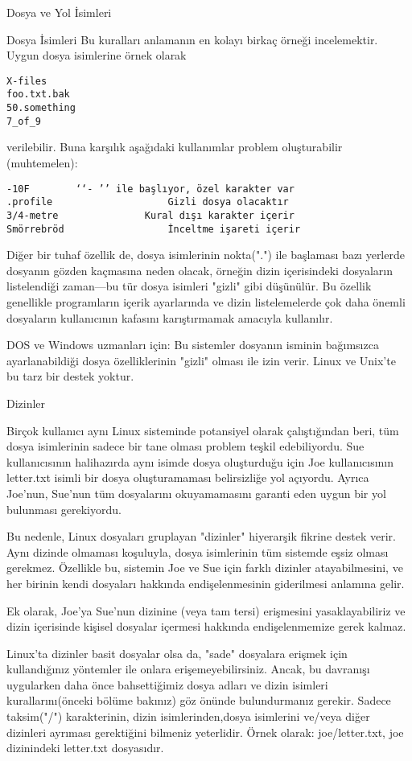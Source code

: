 \begin{section}{Dosya ve Yol İsimleri}
\begin{subsection}{Dosya İsimleri}
Bu kuralları anlamanın en kolayı birkaç örneği incelemektir. Uygun dosya isimlerine örnek olarak
\begin{verbatim}
X-files
foo.txt.bak
50.something
7_of_9
\end{verbatim}
verilebilir. Buna karşılık aşağıdaki kullanımlar problem oluşturabilir (muhtemelen):
\begin{verbatim}
-10F 		‘‘- ’’ ile başlıyor, özel karakter var
.profile 					Gizli dosya olacaktır
3/4-metre 				Kural dışı karakter içerir
Smörrebröd 					İnceltme işareti içerir
\end{verbatim}

Diğer bir tuhaf özellik de, dosya isimlerinin nokta(".") ile başlaması bazı yerlerde dosyanın gözden kaçmasına neden olacak, örneğin dizin içerisindeki dosyaların listelendiği zaman—bu tür dosya isimleri "gizli" gibi düşünülür. Bu özellik genellikle programların içerik ayarlarında ve dizin listelemelerde çok daha önemli dosyaların kullanıcının kafasını karıştırmamak amacıyla kullanılır.

DOS ve Windows uzmanları için: Bu sistemler dosyanın isminin bağımsızca ayarlanabildiği dosya özelliklerinin "gizli" olması ile izin verir. Linux ve Unix'te bu tarz bir destek yoktur.
\end{subsection}
\begin{subsection}{Dizinler}

Birçok kullanıcı aynı Linux sisteminde potansiyel olarak çalıştığından beri, tüm dosya isimlerinin sadece bir tane olması problem teşkil edebiliyordu. Sue kullanıcısının halihazırda aynı isimde dosya oluşturduğu için Joe kullanıcısının letter.txt isimli bir dosya oluşturamaması belirsizliğe yol açıyordu. Ayrıca Joe'nun, Sue'nun tüm dosyalarını okuyamamasını garanti eden uygun bir yol bulunması gerekiyordu.

	Bu nedenle, Linux dosyaları gruplayan "dizinler" hiyerarşik fikrine destek verir. Aynı dizinde olmaması koşuluyla, dosya isimlerinin  tüm sistemde eşsiz olması gerekmez. Özellikle bu, sistemin Joe ve Sue için farklı dizinler atayabilmesini, ve her birinin kendi dosyaları hakkında endişelenmesinin giderilmesi anlamına gelir.
	
	Ek olarak, Joe'ya Sue'nun dizinine (veya tam tersi) erişmesini yasaklayabiliriz ve dizin içerisinde kişisel dosyalar içermesi hakkında endişelenmemize gerek kalmaz.
	
	Linux'ta dizinler basit dosyalar olsa da, "sade" dosyalara erişmek için kullandığınız yöntemler ile onlara erişemeyebilirsiniz. Ancak, bu davranışı uygularken daha önce bahsettiğimiz dosya adları ve dizin isimleri kurallarını(önceki bölüme bakınız) göz önünde bulundurmanız gerekir. Sadece taksim("/") karakterinin, dizin isimlerinden,dosya isimlerini ve/veya diğer dizinleri ayrıması gerektiğini bilmeniz yeterlidir. Örnek olarak: joe/letter.txt, joe dizinindeki letter.txt dosyasıdır.
	

\end{subsection}
\end{section}

